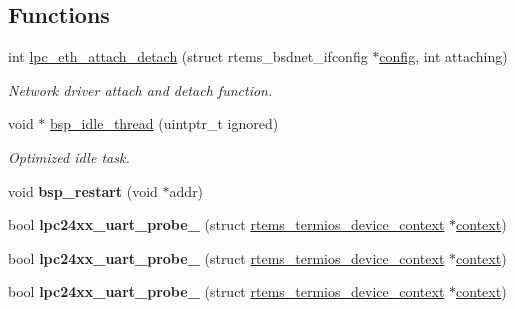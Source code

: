 \subsection*{Functions}
\begin{DoxyCompactItemize}
\item 
\mbox{\label{group__RTEMSBSPsARMLPC24XX_ga1ee87990424a1bed28cb5081a56043b2}} 
int \mbox{\hyperlink{group__RTEMSBSPsARMLPC24XX_ga1ee87990424a1bed28cb5081a56043b2}{lpc\+\_\+eth\+\_\+attach\+\_\+detach}} (struct rtems\+\_\+bsdnet\+\_\+ifconfig $\ast$\mbox{\hyperlink{structconfig__s}{config}}, int attaching)
\begin{DoxyCompactList}\small\item\em Network driver attach and detach function. \end{DoxyCompactList}\item 
void $\ast$ \mbox{\hyperlink{group__RTEMSBSPsARMLPC24XX_ga301be7085b80c41a9c5887247003c662}{bsp\+\_\+idle\+\_\+thread}} (uintptr\+\_\+t ignored)
\begin{DoxyCompactList}\small\item\em Optimized idle task. \end{DoxyCompactList}\item 
\mbox{\label{group__RTEMSBSPsARMLPC24XX_ga22e8ff0c484a388835087ab82844fa5b}} 
void {\bfseries bsp\+\_\+restart} (void $\ast$addr)
\item 
\mbox{\label{group__RTEMSBSPsARMLPC24XX_gab2205a0ac20f2d085f05f7d53ec2f754}} 
bool {\bfseries lpc24xx\+\_\+uart\+\_\+probe\+\_} (struct \mbox{\hyperlink{structrtems__termios__device__context}{rtems\+\_\+termios\+\_\+device\+\_\+context}} $\ast$\mbox{\hyperlink{sun4u_2tte_8h_a9b4a99475e2709333b8e5d70483173f1}{context}})
\item 
\mbox{\label{group__RTEMSBSPsARMLPC24XX_ga699dc0b86c047ef05292bb159d36ab63}} 
bool {\bfseries lpc24xx\+\_\+uart\+\_\+probe\+\_} (struct \mbox{\hyperlink{structrtems__termios__device__context}{rtems\+\_\+termios\+\_\+device\+\_\+context}} $\ast$\mbox{\hyperlink{sun4u_2tte_8h_a9b4a99475e2709333b8e5d70483173f1}{context}})
\item 
\mbox{\label{group__RTEMSBSPsARMLPC24XX_ga12a3ab98c362a1fcdf0bc1e95d077f76}} 
bool {\bfseries lpc24xx\+\_\+uart\+\_\+probe\+\_} (struct \mbox{\hyperlink{structrtems__termios__device__context}{rtems\+\_\+termios\+\_\+device\+\_\+context}} $\ast$\mbox{\hyperlink{sun4u_2tte_8h_a9b4a99475e2709333b8e5d70483173f1}{context}})
\end{DoxyCompactItemize}



